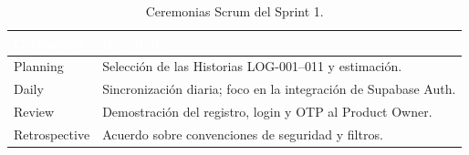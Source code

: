 \begin{table}[!ht]
    \centering
    \renewcommand{\arraystretch}{1.3}
    \fontsize{9}{10.8}\selectfont\sffamily
    \begin{tabularx}{\textwidth}{|l|X|}
        \hline
        \rowcolor{colorPrimario}
        \textcolor{white}{\textbf{Ceremonia}} & \textcolor{white}{\textbf{Resultado}} \\ \hline
        Planning & Selección de las Historias LOG-001--011 y estimación. \\ \hline
        \rowcolor{grisTecnico}
        Daily & Sincronización diaria; foco en la integración de Supabase Auth. \\ \hline
        Review & Demostración del registro, login y OTP al Product Owner. \\ \hline
        \rowcolor{grisTecnico}
        Retrospective & Acuerdo sobre convenciones de seguridad y filtros. \\ \hline
    \end{tabularx}
    \caption{Ceremonias Scrum del Sprint 1.}
    \label{tab:s1_ceremonias}
\end{table}

\clearpage
